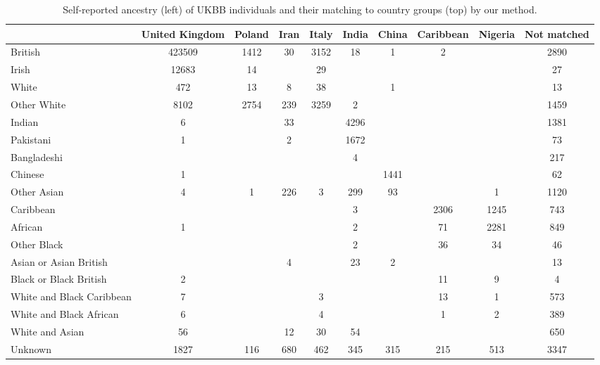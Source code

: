 \begin{table}[p]
\centering
\caption{Self-reported ancestry (left) of UKBB individuals and their matching to country groups (top) by our method.} 
\label{tab:country-groups}
\begin{tabular}{|l|c|c|c|c|c|c|c|c|c|}
  \hline
 & United Kingdom & Poland & Iran & Italy & India & China & Caribbean & Nigeria & Not matched \\ 
  \hline
British & 423509 & 1412 & 30 & 3152 & 18 & 1 & 2 &  & 2890 \\ 
  Irish & 12683 & 14 &  & 29 &  &  &  &  & 27 \\ 
  White & 472 & 13 & 8 & 38 &  & 1 &  &  & 13 \\ 
  Other White & 8102 & 2754 & 239 & 3259 & 2 &  &  &  & 1459 \\ 
   \hline
Indian & 6 &  & 33 &  & 4296 &  &  &  & 1381 \\ 
  Pakistani & 1 &  & 2 &  & 1672 &  &  &  & 73 \\ 
  Bangladeshi &  &  &  &  & 4 &  &  &  & 217 \\ 
  Chinese & 1 &  &  &  &  & 1441 &  &  & 62 \\ 
  Other Asian & 4 & 1 & 226 & 3 & 299 & 93 &  & 1 & 1120 \\ 
   \hline
Caribbean &  &  &  &  & 3 &  & 2306 & 1245 & 743 \\ 
  African & 1 &  &  &  & 2 &  & 71 & 2281 & 849 \\ 
  Other Black &  &  &  &  & 2 &  & 36 & 34 & 46 \\ 
   \hline
Asian or Asian British &  &  & 4 &  & 23 & 2 &  &  & 13 \\ 
  Black or Black British & 2 &  &  &  &  &  & 11 & 9 & 4 \\ 
  White and Black Caribbean & 7 &  &  & 3 &  &  & 13 & 1 & 573 \\ 
  White and Black African & 6 &  &  & 4 &  &  & 1 & 2 & 389 \\ 
  White and Asian & 56 &  & 12 & 30 & 54 &  &  &  & 650 \\ 
   \hline
Unknown  & 1827 & 116 & 680 & 462 & 345 & 315 & 215 & 513 & 3347 \\ 
   \hline
\end{tabular}
\end{table}
